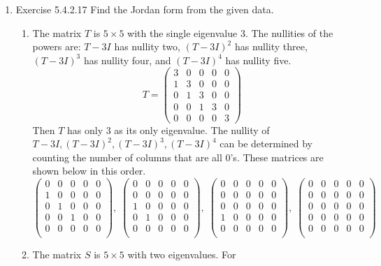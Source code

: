 \documentclass[a4paper]{article}
\begin{document}
\begin{enumerate}
\item{Exercise 5.4.2.17} Find the Jordan form from the given data.

\begin{enumerate}
	\item The matrix $T$ is $5\times 5$ with the single
	eigenvalue 3. The nullities of the powers are: $T − 3I$ has
	nullity two, $(T − 3I)^2$ has nullity three, $(T − 3I)^3$ has
	nullity four, and $(T − 3I)^4$ has nullity five.
	$$
	T =
	\begin{pmatrix}
	3&0&0&0&0 \\ 1&3&0&0&0 \\ 0&1&3&0&0 \\ 0&0&1&3&0 \\ 0&0&0&0&3
	\end{pmatrix}
	$$
	Then $T$ has only $3$ as its only eigenvalue. The nullity of 
	$T-3I, (T-3I)^2, (T-3I)^3, (T-3I)^4$ can be determined by
	counting the number of columns that are all 0's. These 
	matrices are shown below in this order.
	$$
	\begin{pmatrix}
	0&0&0&0&0\\ 1&0&0&0&0\\ 0&1&0&0&0\\ 0&0&1&0&0\\ 0&0&0&0&0\\
	\end{pmatrix}, \; 
	\begin{pmatrix}
	0&0&0&0&0\\ 0&0&0&0&0\\ 1&0&0&0&0\\ 0&1&0&0&0\\ 0&0&0&0&0\\
	\end{pmatrix}, \;
	\begin{pmatrix}
	0&0&0&0&0\\ 0&0&0&0&0\\ 0&0&0&0&0\\ 1&0&0&0&0\\ 0&0&0&0&0\\
	\end{pmatrix}, \;
	\begin{pmatrix}
	0&0&0&0&0\\ 0&0&0&0&0\\ 0&0&0&0&0\\ 0&0&0&0&0\\ 0&0&0&0&0\\
	\end{pmatrix}
	$$
	\item The matrix $S$ is $5\times 5$ with two eigenvalues. For

\end{enumerate}
\end{enumerate}
\end{document}

